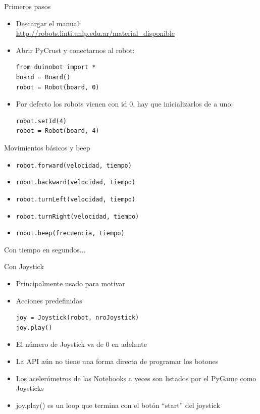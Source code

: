 \documentclass{beamer}[10]
\begin{document}
\begin{frame}[fragile]{Primeros pasos}
	\begin{itemize}[<+->]
		\item Descargar el manual:\\
		{\footnotesize
		\url{http://robots.linti.unlp.edu.ar/material\_disponible}}
		\item Abrir PyCrust y conectarnos al robot:
\begin{block}{}
\begin{lstlisting}
from duinobot import *
board = Board()
robot = Robot(board, 0)
\end{lstlisting}
\end{block}
		\item Por defecto los robots vienen con id 0, hay que inicializarlos de a uno:
\begin{block}{}
\begin{lstlisting}
robot.setId(4)
robot = Robot(board, 4)
\end{lstlisting}
\end{block}
	\end{itemize}
\end{frame}
\begin{frame}[fragile]{Movimientos básicos y beep}
	\begin{itemize}
		\item \verb+robot.forward(velocidad, tiempo)+
		\item \verb+robot.backward(velocidad, tiempo)+
		\item \verb+robot.turnLeft(velocidad, tiempo)+
		\item \verb+robot.turnRight(velocidad, tiempo)+
		\item \verb+robot.beep(frecuencia, tiempo)+
	\end{itemize}
	Con tiempo en segundos...
\end{frame}
\begin{frame}[fragile]{Con Joystick}
	\begin{itemize}[<+->]
		\item Principalmente usado para motivar
		\item Acciones predefinidas
\begin{block}{}
\begin{lstlisting}
joy = Joystick(robot, nroJoystick)
joy.play()
\end{lstlisting}
\end{block}
		\item El número de Joystick va de 0 en adelante
		\item La API aún no tiene una forma directa de programar los botones
		\item Los acelerómetros de las Notebooks a veces son listados por el PyGame como Joysticks
		\item joy.play() es un loop que termina con el botón ``start'' del joystick
	\end{itemize}
\end{frame}
\end{document}
